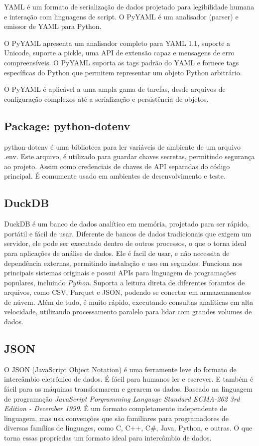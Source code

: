 YAML é um formato de serialização de dados projetado para legibilidade humana e interação com linguagens de script. O PyYAML é um analisador (parser) e emissor de YAML para Python.

O PyYAML apresenta um analisador completo para YAML 1.1, suporte a Unicode, suporte a pickle, uma API de extensão capaz e mensagens de erro compreensíveis. O PyYAML suporta as tags padrão do YAML e fornece tags específicas do Python que permitem representar um objeto Python arbitrário.

O PyYAML é aplicável a uma ampla gama de tarefas, desde arquivos de configuração complexos até a serialização e persistência de objetos.\cite{pypi_pyyaml}

\subsection{Package: python-dotenv}

python-dotenv é uma biblioteca para ler variáveis de ambiente de um arquivo .env. Este arquivo, é utilizado para guardar chaves secretas, permitindo segurança ao projeto. Assim como credenciais de chaves de API separadas do código principal. É comumente usado em ambientes de desenvolvimento e teste.\cite{dotenv_docs}

\subsection{DuckDB}
DuckDB é um banco de dados analítico em memória, projetado para ser rápido, portátil e fácil de usar. Diferente de bancos de dados tradicionais que exigem um servidor, ele pode ser executado dentro de outros processos, o que o torna ideal para aplicações de análise de dados. Ele é facil de usar, e não necessita de dependência externas, permitindo instalação e uso em segundos. Funciona nos principais sistemas originais e possui APIs para linguagem de programações populares, incluindo \textit{Python}. Suporta a leitura direta de diferentes foramtos de arquivos, como CSV, Parquet e JSON, podendo se conectar em armazenamentos de núvem. Além  de tudo, é muito rápido, executando consultas analíticas em alta velocidade, utilizando processamento paralelo para lidar com grandes volumes de dados.\cite{duckdb_docs}

\subsection{JSON}

O JSON (JavaScript Object Notation) é uma ferramente leve do formato de intercâmbio eletrônico de dados. É fácil para humanos ler e escrever. E também é fácil para as máquinas transformarem e gerarem os dados. Baseado na linguagem de programação \textit{JavaScript Porgramming Language Standard ECMA-262 3rd Edition - December 1999}. É um formato completamente independente de linguagem, mas usa convenções que são familiares para programadores de diversas famílias de linguages, como C, C++, C\#, Java, Python, e outras. O que torna essas propriedas um formato ideal para intercâmbio de dados.\cite{json_org}

